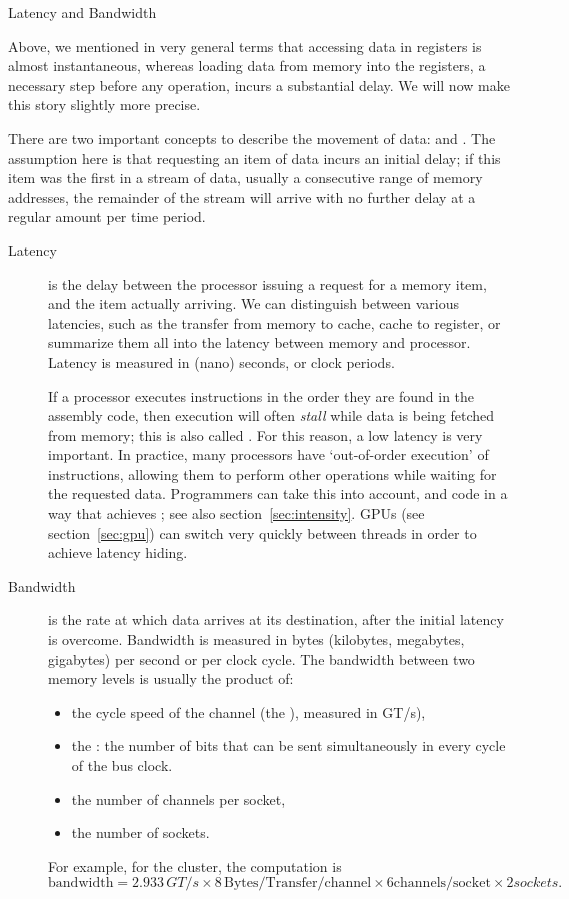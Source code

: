  {Latency and Bandwidth}
\label{sec:latencybandwidth}

Above, we mentioned in very general terms that accessing data in
registers is almost instantaneous, whereas loading data from memory
into the registers, a necessary step before any operation, incurs a
substantial delay. We will now make this story slightly more precise.

There are two important concepts to describe the movement of data:
 and . The assumption here is
that requesting an item of data incurs an initial delay; if this item
was the first in a stream of data, usually a consecutive range of
memory addresses, the remainder of the stream will arrive with no
further delay
at a regular amount per time period.
\begin{description}
\item[Latency] is the delay between the processor issuing a request
  for a memory item, and the item actually arriving. We can
  distinguish between various latencies, such as the transfer from
  memory to cache, cache to register, or summarize them all into the
  latency between memory and processor. Latency is measured in (nano)
  seconds, or clock periods.

  If a processor executes instructions in the order they are found in
  the assembly code, then execution will often \emph{stall} while
  data is being fetched from memory; this is also called
  . For this reason, a low latency is very
  important. In practice, many processors have `out-of-order
  execution' of instructions, allowing them to perform other
  operations while waiting for the requested data. Programmers can
  take this into account, and code in a way that achieves
  ; see also section~\ref{sec:intensity}.
  \acp{GPU} (see section~\ref{sec:gpu})  
  can switch very quickly between threads in order to achieve latency hiding.
\item[Bandwidth] is the rate at which data arrives at its destination,
  after the initial latency is overcome. Bandwidth is measured in
  bytes (kilobytes, megabytes, gigabytes) per second or per clock cycle.
  The bandwidth between two memory levels is usually the product of:
  \begin{itemize}
  \item
    the cycle speed of the channel (the ), measured in GT/s),
  \item 
    the : the number of bits that can be sent
    simultaneously in every cycle of the bus clock.
  \item the number of channels per socket,
  \item the number of sockets.
  \end{itemize}
  For example, for the  cluster, the
  computation is
  \[ \mathrm{bandwidth} = 2.933\, GT/s \times 8\, \mathrm{Bytes/Transfer/channel} \times 6 \mathrm{channels/socket} \times 2 sockets. \]
\end{description}

